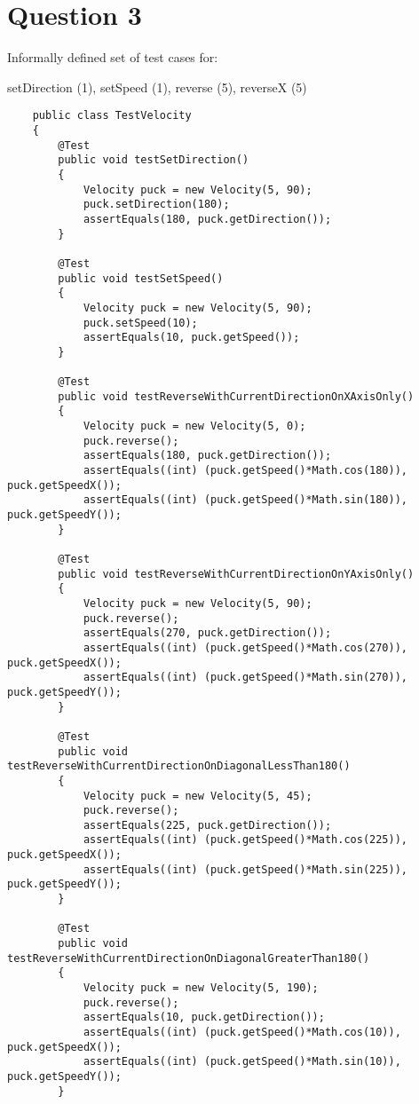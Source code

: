 \documentclass{article}
\begin{document}
\section*{Question 3}

Informally defined set of test cases for:

setDirection (1), setSpeed (1), reverse (5), reverseX (5)

\begin{lstlisting}
    public class TestVelocity
    {
        @Test
        public void testSetDirection()
        {
            Velocity puck = new Velocity(5, 90);
            puck.setDirection(180);
            assertEquals(180, puck.getDirection());
        }

        @Test
        public void testSetSpeed()
        {
            Velocity puck = new Velocity(5, 90);
            puck.setSpeed(10);
            assertEquals(10, puck.getSpeed());
        }

        @Test
        public void testReverseWithCurrentDirectionOnXAxisOnly()
        {
            Velocity puck = new Velocity(5, 0);
            puck.reverse();
            assertEquals(180, puck.getDirection());
            assertEquals((int) (puck.getSpeed()*Math.cos(180)), puck.getSpeedX());
            assertEquals((int) (puck.getSpeed()*Math.sin(180)), puck.getSpeedY());
        }

        @Test
        public void testReverseWithCurrentDirectionOnYAxisOnly()
        {
            Velocity puck = new Velocity(5, 90);
            puck.reverse();
            assertEquals(270, puck.getDirection());
            assertEquals((int) (puck.getSpeed()*Math.cos(270)), puck.getSpeedX());
            assertEquals((int) (puck.getSpeed()*Math.sin(270)), puck.getSpeedY());
        }

        @Test
        public void testReverseWithCurrentDirectionOnDiagonalLessThan180()
        {
            Velocity puck = new Velocity(5, 45);
            puck.reverse();
            assertEquals(225, puck.getDirection());
            assertEquals((int) (puck.getSpeed()*Math.cos(225)), puck.getSpeedX());
            assertEquals((int) (puck.getSpeed()*Math.sin(225)), puck.getSpeedY());
        }

        @Test
        public void testReverseWithCurrentDirectionOnDiagonalGreaterThan180()
        {
            Velocity puck = new Velocity(5, 190);
            puck.reverse();
            assertEquals(10, puck.getDirection());
            assertEquals((int) (puck.getSpeed()*Math.cos(10)), puck.getSpeedX());
            assertEquals((int) (puck.getSpeed()*Math.sin(10)), puck.getSpeedY());
        }


\end{lstlisting}
\end{document}
